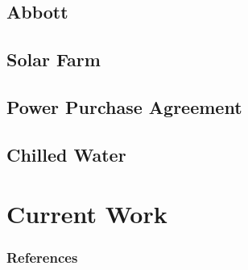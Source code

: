 \documentclass[9pt]{beamer}
\begin{document}
\subsection{Abbott}

\subsection{Solar Farm}

\subsection{Power Purchase Agreement}

\subsection{Chilled Water}

\section{Current Work}

% 
\begin{frame}[allowframebreaks]
  \frametitle{References}
  
  {\footnotesize  }

\end{frame}

\end{document}
